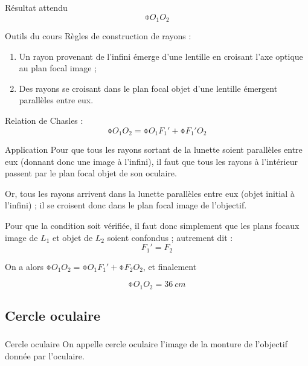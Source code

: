 \documentclass[10pt,a5paper,notitlepage]{book}
\begin{document}
\subsubsection{}
\begin{NCprop}{Résultat attendu}
    $$\obar{O_1O_2}$$
\end{NCprop}

\begin{NCdemo}{Outils du cours}
    Règles de construction de rayons :
    \begin{enumerate}

        \item Un rayon provenant de l'infini émerge d'une lentille en croisant
            l'axe optique au plan focal image ;

        \item Des rayons se croisant dans le plan focal objet d'une lentille
            émergent parallèles entre eux.
    \end{enumerate}
    Relation de Chasles :
    \[ \obar{O_1O_2} = \obar{O_1F_1'} + \obar{F_1'O_2} \]
\end{NCdemo}

\begin{NCexem}{Application}
    Pour que tous les rayons sortant de la lunette soient parallèles entre eux
    (donnant donc une image à l'infini), il faut que tous les rayons à
    l'intérieur passent par le plan focal objet de son oculaire.\bigbreak

    Or, tous les rayons arrivent dans la lunette parallèles entre eux (objet
    initial à l'infini) ; il se croisent donc dans le plan focal image de
    l'objectif. \bigbreak

    Pour que la condition soit vérifiée, il faut donc simplement que les plans
    focaux image de $L_1$ et objet de $L_2$ soient confondus ; autrement dit :
    \[ \boxed{F_1' = F_2} \]
    
    On a alors $\obar{O_1O_2} = \obar{O_1F_1'} + \obar{F_2O_2}$, et finalement

    \[ \boxed{\obar{O_1O_2} = \SI{+36}{cm}} \]
\end{NCexem}

\subsection{Cercle oculaire}
\subsubsection{}
\begin{defi}{Cercle oculaire}
    On appelle cercle oculaire l'image de la monture de l'objectif donnée par
    l'oculaire.
\end{defi}
\end{document}
